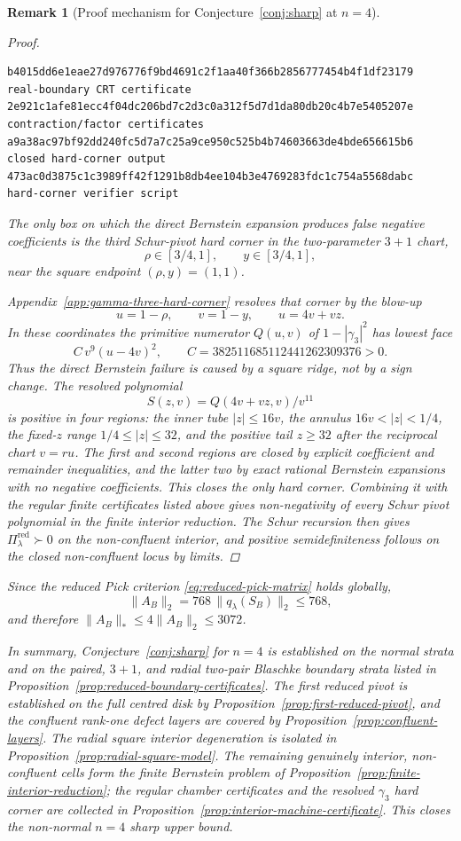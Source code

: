 \documentclass[11pt]{article}
\newtheorem{remark}[theorem]{Remark}
\numberwithin{equation}{section}
\begin{document}
\begin{remark}[Proof mechanism for Conjecture~\ref{conj:sharp} at $n=4$]
\begin{proof}
\begin{scriptsize}
\begin{verbatim}
b4015dd6e1eae27d976776f9bd4691c2f1aa40f366b2856777454b4f1df23179  real-boundary CRT certificate
2e921c1afe81ecc4f04dc206bd7c2d3c0a312f5d7d1da80db20c4b7e5405207e  contraction/factor certificates
a9a38ac97bf92dd240fc5d7a7c25a9ce950c525b4b74603663de4bde656615b6  closed hard-corner output
473ac0d3875c1c3989ff42f1291b8db4ee104b3e4769283fdc1c754a5568dabc  hard-corner verifier script
\end{verbatim}
\end{scriptsize}
The only box on which the direct Bernstein expansion produces false negative
coefficients is the third Schur-pivot hard corner in the two-parameter
\(3{+}1\) chart,
\[
  \rho\in[3/4,1],\qquad y\in[3/4,1],
\]
near the square endpoint \((\rho,y)=(1,1)\).

Appendix~\ref{app:gamma-three-hard-corner} resolves that corner by the
blow-up
\[
  u=1-\rho,\qquad v=1-y,\qquad u=4v+vz.
\]
In these coordinates the primitive numerator \(Q(u,v)\) of
\(1-|\gamma_3|^2\) has lowest face
\[
  C\,v^9(u-4v)^2,\qquad
  C=382511685112441262309376>0.
\]
Thus the direct Bernstein failure is caused by a square ridge, not by a sign
change.  The resolved polynomial
\[
  S(z,v)=Q(4v+vz,v)/v^{11}
\]
is positive in four regions: the inner tube \(|z|\le16v\), the annulus
\(16v<|z|<1/4\), the fixed-\(z\) range \(1/4\le |z|\le32\), and the positive
tail \(z\ge32\) after the reciprocal chart \(v=ru\).  The first and second
regions are closed by explicit coefficient and remainder inequalities, and
the latter two by exact rational Bernstein expansions with no negative
coefficients.  This closes the only hard corner.  Combining it with the
regular finite certificates listed above gives non-negativity of every Schur
pivot polynomial in the finite interior reduction.  The Schur recursion then
gives \(\Pi^{\mathrm{red}}_\lambda\succ0\) on the non-confluent interior, and
positive semidefiniteness follows on the closed non-confluent locus by limits.
\end{proof}

Since the reduced Pick criterion \eqref{eq:reduced-pick-matrix} holds globally,
\[
  \|A_B\|_2
  =768\,\|q_\lambda(S_B)\|_2
  \le768,
\]
and therefore \(\|A_B\|_*\le4\|A_B\|_2\le3072\).

\smallskip
In summary, Conjecture~\ref{conj:sharp} for $n=4$ is established on the
normal strata and on the paired, \(3{+}1\), and radial two-pair Blaschke
boundary strata listed in Proposition~\ref{prop:reduced-boundary-certificates}.
The first reduced pivot is established on the full centred disk by
Proposition~\ref{prop:first-reduced-pivot}, and the confluent rank-one defect
layers are covered by Proposition~\ref{prop:confluent-layers}.  The radial
square interior degeneration is isolated in
Proposition~\ref{prop:radial-square-model}.  The remaining genuinely interior,
non-confluent cells form the finite Bernstein problem of
Proposition~\ref{prop:finite-interior-reduction}; the regular chamber
certificates and the resolved \(\gamma_3\) hard corner are collected in
Proposition~\ref{prop:interior-machine-certificate}.  This closes the
non-normal \(n=4\) sharp upper bound.
\end{remark}
\end{document}
